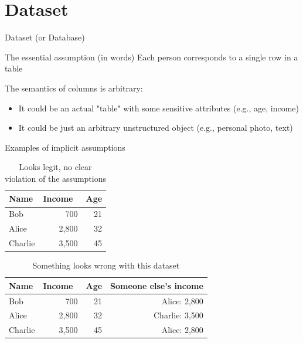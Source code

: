 \documentclass[12pt,aspectratio=169,handout]{beamer}
\begin{document}
\section{Dataset}

\begin{frame}{Dataset (or Database)}

\begin{block}{The essential assumption (in words)}
Each person corresponds to a single row in a table
\end{block}

The semantics of columns is arbitrary:

\begin{itemize}
\item It could be an actual "table" with some sensitive attributes (e.g., age, income)
\item It could be just an arbitrary unstructured object (e.g., personal photo, text)
\end{itemize}

\end{frame}



\begin{frame}{Examples of implicit assumptions}

\begin{table}
\footnotesize
\begin{tabular}{lrr} \toprule
Name & Income & Age \\ \midrule
Bob & 700 & 21 \\
Alice & 2,800 & 32 \\
Charlie & 3,500 & 45 \\ \bottomrule
\end{tabular}
\caption{Looks legit, no clear violation of the assumptions}
\end{table}

\vspace{-1em}
\begin{table}
\footnotesize
\begin{tabular}{lrrr} \toprule
Name & Income & Age & Someone else's income \\ \midrule
Bob & 700 & 21 & Alice: 2,800\\
Alice & 2,800 & 32 & Charlie: 3,500 \\
Charlie & 3,500 & 45 & Alice: 2,800 \\ \bottomrule
\end{tabular}
\caption{Something looks wrong with this dataset}
\end{table}

\end{frame}
\end{document}

